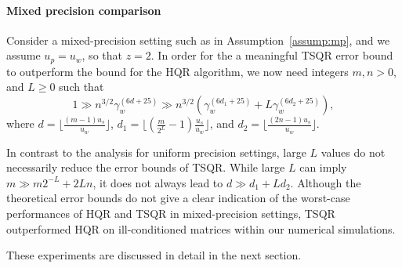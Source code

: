 \paragraph{Mixed precision comparison}Consider a mixed-precision setting such as in Assumption~\ref{assump:mp}, and we assume $u_p=u_w$, so that $z=2$.
In order for the a meaningful TSQR error bound to outperform the bound for the HQR algorithm, we now need integers $m, n > 0$, and $L\geq 0$ such that
\begin{equation*}
1\gg n^{3/2}\gamma_w^{(6d + 25)} \gg n^{3/2}(\gamma_w^{(6d_1+ 25)}+L\gamma_w^{(6d_2+ 25)}),
\end{equation*}
where $d=\lfloor\frac{(m-1) u_s}{u_w}\rfloor$, $d_1 = \lfloor{(\frac{m}{2^L}-1)\frac{u_s}{u_w}\rfloor}$, and $d_2 =\lfloor \frac{(2n-1)u_s}{u_w}\rfloor$. 

In contrast to the analysis for uniform precision settings, large $L$ values do not necessarily reduce the error bounds of TSQR. 
While large $L$ can imply $m\gg m2^{-L}+2Ln$, it does not always lead to $d \gg d_1+Ld_2$.
Although the theoretical error bounds do not give a clear indication of the worst-case performances of HQR and TSQR in mixed-precision settings, TSQR outperformed HQR on ill-conditioned matrices within our numerical simulations.

These experiments are discussed in detail in the next section.%



